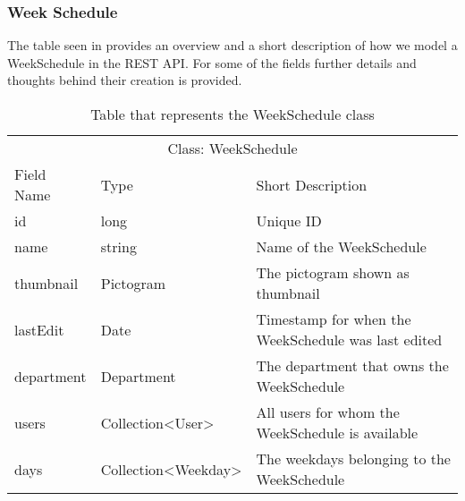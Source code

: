 \subsubsection{Week Schedule}
The table seen in  provides an overview and a short description of how we model a WeekSchedule in the REST API.
For some of the fields further details and thoughts behind their creation is provided.

\begin{table}[]
\centering
\caption{Table that represents the WeekSchedule class}
\label{tbl:WeekSchedule}
\begin{tabular}{lll}
\multicolumn{3}{c}{Class: WeekSchedule}                                                                      \\
Field Name & Type                                    & Short Description                                     \\
id         & long                                    & Unique ID                                             \\
name       & string                                  & Name of the WeekSchedule                              \\
thumbnail  & Pictogram                               & The pictogram shown as thumbnail                      \\
lastEdit   & Date                                    & Timestamp for when the WeekSchedule was last edited   \\
department & Department                              & The department that owns the WeekSchedule             \\
users      & Collection\textless User\textgreater    & All users for whom the WeekSchedule is available      \\
days       & Collection\textless Weekday\textgreater & The weekdays belonging to the WeekSchedule           
\end{tabular}
\end{table}

